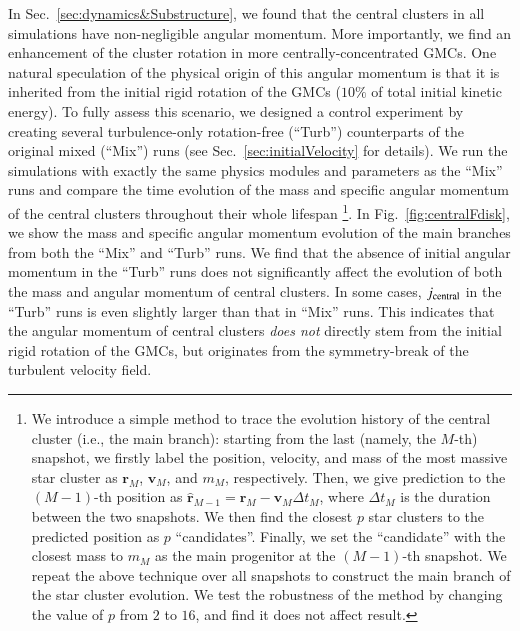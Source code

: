 \documentclass[fleqn,usenatbib]{mnras}
\begin{document}
In Sec.~\ref{sec:dynamics&Substructure}, we found that the central clusters in all simulations have non-negligible angular momentum.
More importantly, we find an enhancement of the cluster rotation in more centrally-concentrated GMCs.
One natural speculation of the physical origin of this angular momentum is that it is inherited from the initial rigid rotation of the GMCs ($10\%$ of total initial kinetic energy).
To fully assess this scenario, we designed a control experiment by creating several turbulence-only rotation-free (``Turb'') counterparts of the original mixed (``Mix'') runs (see Sec.~\ref{sec:initialVelocity} for details).
We run the simulations with exactly the same physics modules and parameters as the ``Mix'' runs and compare the time evolution of the mass and specific angular momentum of the central clusters throughout their whole lifespan \footnote{We introduce a simple method to trace the evolution history of the central cluster (i.e., the main branch): starting from the last (namely, the $M$-th) snapshot, we firstly label the position, velocity, and mass of the most massive star cluster as $\mathbf{r}_M$, $\mathbf{v}_M$, and $m_M$, respectively. Then, we give prediction to the $(M-1)$-th position as $\hat{\mathbf{r}}_{M-1}=\mathbf{r}_M-\mathbf{v}_M\Delta t_M$, where $\Delta t_M$ is the duration between the two snapshots. We then find the closest $p$ star clusters to the predicted position as $p$ ``candidates''. Finally, we set the ``candidate'' with the closest mass to $m_M$ as the main progenitor at the $(M-1)$-th snapshot. We repeat the above technique over all snapshots to construct the main branch of the star cluster evolution. We test the robustness of the method by changing the value of $p$ from $2$ to $16$, and find it does not affect result.}.
In Fig.~\ref{fig:centralFdisk}, we show the mass and specific angular momentum evolution of the main branches from both the ``Mix'' and ``Turb'' runs. We find that the absence of initial angular momentum in the ``Turb'' runs does not significantly affect the evolution of both the mass and angular momentum of central clusters.
In some cases, $j_{\rm central}$ in the ``Turb'' runs is even slightly larger than that in ``Mix'' runs. This indicates that the angular momentum of central clusters \textit{does not} directly stem from the initial rigid rotation of the GMCs, but originates from the symmetry-break of the turbulent velocity field.
\end{document}
